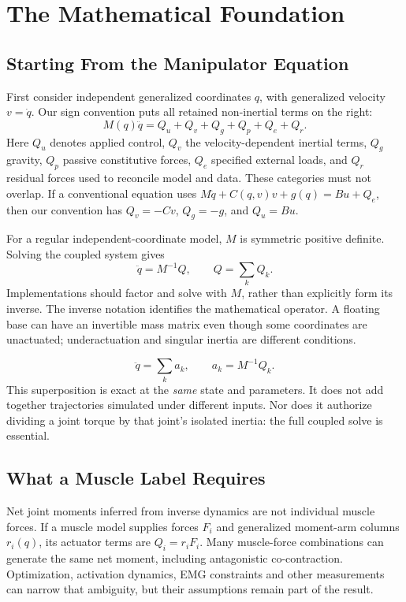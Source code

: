 \section{The Mathematical Foundation}
\label{sec:iaa_math}

\subsection{Starting From the Manipulator Equation}
First consider independent generalized coordinates \(q\), with generalized velocity \(v=\dot q\). Our sign convention puts all retained non-inertial terms on the right:
\begin{equation}
 M(q)\ddot q=Q_u+Q_v+Q_g+Q_p+Q_e+Q_r.
 \label{eq:iaa_eom}
\end{equation}
Here \(Q_u\) denotes applied control, \(Q_v\) the velocity-dependent inertial terms, \(Q_g\) gravity, \(Q_p\) passive constitutive forces, \(Q_e\) specified external loads, and \(Q_r\) residual forces used to reconcile model and data. These categories must not overlap. If a conventional equation uses \(M\ddot q+C(q,v)v+g(q)=Bu+Q_e\), then our convention has \(Q_v=-Cv\), \(Q_g=-g\), and \(Q_u=Bu\).

For a regular independent-coordinate model, \(M\) is symmetric positive definite. Solving the coupled system gives
\begin{equation}
 \ddot q=M^{-1}Q,\qquad Q=\sum_k Q_k.
 \label{eq:iaa_forward}
\end{equation}
Implementations should factor and solve with \(M\), rather than explicitly form its inverse. The inverse notation identifies the mathematical operator. A floating base can have an invertible mass matrix even though some coordinates are unactuated; underactuation and singular inertia are different conditions.

\begin{equation}
 \ddot q=\sum_k a_k,\qquad a_k=M^{-1}Q_k.
 \label{eq:iaa_superposition}
\end{equation}
This superposition is exact at the \emph{same} state and parameters. It does not add together trajectories simulated under different inputs. Nor does it authorize dividing a joint torque by that joint's isolated inertia: the full coupled solve is essential.

\subsection{What a Muscle Label Requires}
Net joint moments inferred from inverse dynamics are not individual muscle forces. If a muscle model supplies forces \(F_i\) and generalized moment-arm columns \(r_i(q)\), its actuator terms are \(Q_i=r_iF_i\). Many muscle-force combinations can generate the same net moment, including antagonistic co-contraction. Optimization, activation dynamics, EMG constraints and other measurements can narrow that ambiguity, but their assumptions remain part of the result.

